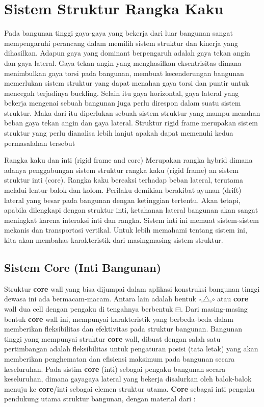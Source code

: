\documentclass[../modul_skb.tex]{subfiles}
\begin{document}
\section{Sistem Struktur Rangka Kaku}%
\label{sec:Sistem Struktur Rangka Kaku}

Pada bangunan tinggi gaya-gaya yang bekerja dari luar bangunan sangat mempengaruhi perancang dalam memilih sistem struktur dan kinerja yang dihasilkan. Adapun gaya yang dominant berpengaruh adalah gaya tekan angin dan gaya lateral. Gaya tekan angin yang menghasilkan eksentrisitas dimana menimbulkan gaya torsi pada bangunan, membuat kecenderungan bangunan memerlukan sistem struktur yang dapat menahan gaya torsi dan puntir untuk mencegah terjadinya buckling. Selain itu gaya horizontal, gaya lateral yang bekerja mengenai sebuah bangunan juga perlu direspon dalam suatu sistem struktur. Maka dari itu diperlukan sebuah sistem struktur yang mampu menahan beban gaya tekan angin dan gaya lateral. Struktur rigid frame merupakan sistem struktur yang perlu dianalisa lebih lanjut apakah dapat memenuhi kedua permasalahan tersebut

Rangka kaku dan inti (rigid frame and core) Merupakan rangka hybrid dimana adanya penggabungan sistem struktur rangka kaku (rigid frame) an sistem struktur inti (core). Rangka kaku bereaksi terhadap beban lateral, terutama melalui lentur balok dan kolom. Perilaku demikian berakibat ayunan (drift) lateral yang besar pada bangunan dengan ketinggian tertentu. Akan tetapi, apabila dilengkapi dengan struktur inti, ketahanan lateral bangunan akan sangat meningkat karena interaksi inti dan rangka. Sistem inti ini memuat sistem-sistem mekanis dan transportasi vertikal. Untuk lebih memahami tentang sistem ini, kita akan membahas karakteristik dari masingmasing sistem struktur.

\subsection{Sistem Core (Inti Bangunan)}%
\label{sub:Sistem Core (Inti Bangunan)}


Struktur \textbf{core} wall yang bisa dijumpai dalam aplikasi konstruksi bangunan tinggi dewasa ini ada bermacam-macam. Antara lain adalah bentuk $\square$,$\triangle$,$\circ$ atau \textbf{core} wall dua cell dengan pengaku di tengahnya berbentuk $\boxminus$. Dari masing-masing bentuk \textbf{core} wall ini, mempunyai karakteristik yang berbeda-beda dalam memberikan fleksibilitas dan efektivitas pada struktur bangunan. Bangunan tinggi yang mempunyai struktur \textbf{core} wall, dibuat dengan salah satu pertimbangan adalah fleksibilitas untuk pengaturan posisi (tata letak) yang akan memberikan penghematan dan efisiensi maksimum pada bangunan secara keseluruhan. Pada sistim \textbf{core} (inti) sebagai pengaku bangunan secara keseluruhan, dimana gayagaya lateral yang bekerja disalurkan oleh balok-balok menuju ke \textbf{core}/inti sebagai elemen struktur utama. \textbf{Core} sebagai inti pengaku pendukung utama struktur bangunan, dengan material dari :
\end{document}
